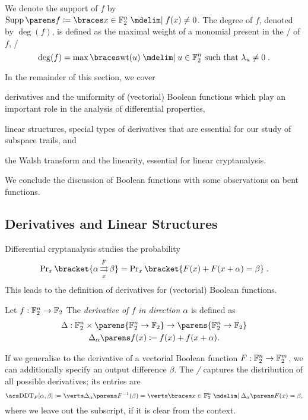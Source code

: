 We denote the support of $f$ by $\supp{f} \coloneqq \set{x \in \F_2^n \given f(x) \neq 0}$.
The degree of $f$, denoted by $\deg(f)$, is defined as the maximal weight of a monomial present in the \ANF/ of $f$, \ie/
\begin{equation*}
    \deg(f) = \max \set{\wt(u) \given u \in \F_2^n \ \text{such that}\ \lambda_u \ne 0}\;.
\end{equation*}

In the remainder of this section, we cover \begin{inparaenum}
\item derivatives and the uniformity of (vectorial) Boolean functions which play an important role in the analysis of differential properties,
\item linear structures, special types of derivatives that are essential for our study of subspace trails, and
\item the Walsh transform and the linearity, essential for linear cryptanalysis.
\end{inparaenum}
We conclude the discussion of Boolean functions with some observations on bent functions.

\subsection{Derivatives and Linear Structures}
Differential cryptanalysis studies the probability
\begin{equation}\label{eqn:prob-diff}
    \Prob_x\bracket{\propDiff{\alpha}{F}{x}{\beta}} = \Prob_x\bracket{F(x) + F(x+\alpha) = \beta}\;.
\end{equation}
This leads to the definition of derivatives for (vectorial) Boolean functions.
\begin{definition}[Derivative]
    Let $f : \mathbb{F}_2^n \to \mathbb{F}_2$
    The \emph{derivative of $f$ in direction $\alpha$} is defined as
    \begin{gather*}
        \Delta : \F_2^n \times \parens{\F_2^n \to \F_2} \to \parens{\F_2^n \to \F_2} \\
        \derive{\alpha}{f}(x) \coloneqq f(x) + f(x + \alpha).
    \end{gather*}
\end{definition}
If we generalise to the derivative of a vectorial Boolean function $F : \mathbb{F}_2^n \to \mathbb{F}_2^m$, we can additionally specify an output difference $\beta$.
The \emph{\DDT/} captures the distribution of all possible derivatives; its entries are
\begin{equation*}
    \text{\DDTs/}_F[\alpha, \beta] \coloneqq \abs{\derive{\alpha}{F}^{-1}(\beta)} = \abs{\set{x \in \F_2^n \given \derive{\alpha}{F}(x) = \beta}},
\end{equation*}
where we leave out the subscript, if it is clear from the context.

